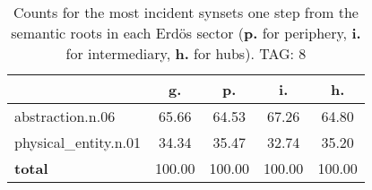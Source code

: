 \begin{table}[h!]
\begin{center}
\begin{tabular}{| l || c | c | c | c |}\hline
 & {\bf g.} & {\bf p.} & {\bf i.} & {\bf h.} \\\hline\hline
abstraction.n.06 & 65.66  & 64.53  & 67.26  & 64.80 \\\hline
physical\_entity.n.01 & 34.34  & 35.47  & 32.74  & 35.20 \\\hline\hline
{{\bf total}} & 100.00  & 100.00  & 100.00  & 100.00 \\\hline
\end{tabular}
\caption{Counts for the most incident synsets one step from the semantic roots in each Erd\"os sector ({\bf p.} for periphery, {\bf i.} for intermediary, {\bf h.} for hubs). TAG: 8}
\end{center}
\end{table}